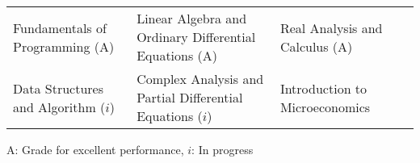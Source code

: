 
\begin{tabular*}{\textwidth}{l l l l}
  Fundamentals of Programming (A) & Linear Algebra and Ordinary Differential Equations (A) & Real Analysis and Calculus (A) \\
  Data Structures and Algorithm ($i$) & Complex Analysis and Partial Differential Equations ($i$) & Introduction to Microeconomics \\
\end{tabular*}
{\footnotesize
    {A: Grade for excellent performance, $i$: In progress}
}

